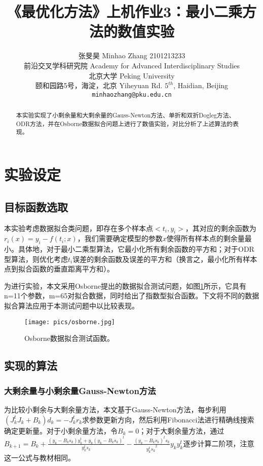 \documentclass{article}
\title{《最优化方法》上机作业3：最小二乘方法的数值实验}
\author{%
  张旻昊 Minhao Zhang 2101213233 \\
  前沿交叉学科研究院 Academy for Advanced Interdisciplinary Studies\\
  北京大学 Peking University\\
  颐和园路5号，海淀，北京 Yiheyuan Rd. $5^{th}$, Haidian, Beijing\\
  \texttt{minhaozhang@pku.edu.cn} \\
}
\begin{document}

\maketitle

\begin{abstract}
  本实验实现了小剩余量和大剩余量的Gauss-Newton方法、单折和双折Dogleg方法、ODR方法，并在Osborne数据拟合问题上进行了数值实验，对比分析了上述算法的表现。
  
\end{abstract}

\section{实验设定}
\subsection{目标函数选取}
本实验考虑数据拟合类问题，即存在多个样本点$<t_i, y_i>$，其对应的剩余函数为$r_i(x) = y_i-f(t_i;x)$，我们需要确定模型的参数$x$使得所有样本点的剩余量最小。具体地，对于最小二乘型算法，它最小化所有剩余函数的平方和；对于ODR型算法，则优化考虑$t_i$误差的剩余函数及误差的平方和（换言之，最小化所有样本点到拟合函数的垂直距离平方和）。

为进行实验，本文采用Osborne提出的数据拟合测试问题，如图\ref{fig:osborne}所示，它具有n=11个参数，m=65对拟合数据，同时给出了指数型拟合函数。下文将不同的数据拟合算法应用于本测试问题中以比较表现。

\begin{figure}[h]
  \centering
  \texttt{[image: pics/osborne.jpg]}
  \caption{Osborne数据拟合测试函数。}
  \label{fig:osborne}
\end{figure}

\subsection{实现的算法}

\subsubsection{大剩余量与小剩余量Gauss-Newton方法}
为比较小剩余与大剩余量方法，本文基于Gauss-Newton方法，每步利用$(J_k^t J_k + B_k) d_k = -J_k^t r_k$求参数更新方向，然后利用Fibonacci法进行精确线搜索确定更新量。对于小剩余量方法，令$B_k=0$；对于大剩余量方法，通过$B_{k+1} = B_k + \frac{(y_k-B_k s_k)y_k^t+y_k{(y_k-B_k s_k)}^t}{y_k^t s_k} - \frac{{(y_k-B_k s_k)}^t s_k}{{y_k^t s_k}^2}y_k y_k^t$逐步计算二阶项，注意这一公式与教材相同。
\end{document}
